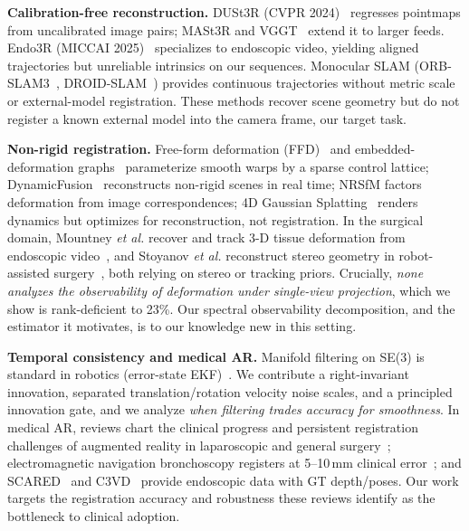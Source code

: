 \documentclass[9pt,twoside,web]{ieeecolor2}
\begin{document}
\textbf{Calibration-free reconstruction.} DUSt3R (CVPR 2024)~\cite{wang2024dust3r} regresses pointmaps from uncalibrated image pairs; MASt3R and VGGT~\cite{wang2025vggt} extend it to larger feeds. Endo3R (MICCAI 2025)~\cite{guo2025endo3r} specializes to endoscopic video, yielding aligned trajectories but unreliable intrinsics on our sequences. Monocular SLAM (ORB-SLAM3~\cite{campos2021orbslam3}, DROID-SLAM~\cite{teed2021droidslam}) provides continuous trajectories without metric scale or external-model registration. These methods recover scene geometry but do not register a known external model into the camera frame, our target task.

\textbf{Non-rigid registration.} Free-form deformation (FFD)~\cite{sederberg1986ffd,rueckert1999nonrigid} and embedded-deformation graphs~\cite{sumner2007embedded} parameterize smooth warps by a sparse control lattice; DynamicFusion~\cite{newcombe2015dynamicfusion} reconstructs non-rigid scenes in real time; NRSfM factors deformation from image correspondences; 4D Gaussian Splatting~\cite{wu20244dgs} renders dynamics but optimizes for reconstruction, not registration. In the surgical domain, Mountney \emph{et al.} recover and track 3-D tissue deformation from endoscopic video~\cite{mountney2010deformation}, and Stoyanov \emph{et al.} reconstruct stereo geometry in robot-assisted surgery~\cite{stoyanov2010stereo}, both relying on stereo or tracking priors. Crucially, \emph{none analyzes the observability of deformation under single-view projection}, which we show is rank-deficient to 23\%. Our spectral observability decomposition, and the estimator it motivates, is to our knowledge new in this setting.

\textbf{Temporal consistency and medical AR.} Manifold filtering on SE(3) is standard in robotics (error-state EKF)~\cite{kalman1960,sola2018lie}. We contribute a right-invariant innovation, separated translation/rotation velocity noise scales, and a principled innovation gate, and we analyze \emph{when filtering trades accuracy for smoothness}. In medical AR, reviews chart the clinical progress and persistent registration challenges of augmented reality in laparoscopic and general surgery~\cite{bernhardt2017ar,vavra2017ar}; electromagnetic navigation bronchoscopy registers at 5--10\,mm clinical error~\cite{gildea2006enb}; and SCARED~\cite{allan2021scared} and C3VD~\cite{bobrow2023c3vd} provide endoscopic data with GT depth/poses. Our work targets the registration accuracy and robustness these reviews identify as the bottleneck to clinical adoption.
\end{document}
